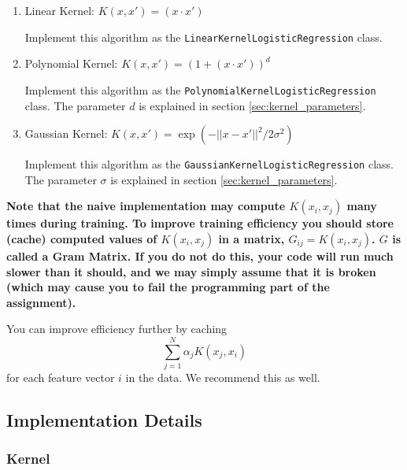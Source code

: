 \documentclass[11pt]{article}
\newcommand{\code}[1]{{\footnotesize \tt #1}}
\begin{document}
\begin{enumerate}
\item Linear Kernel: $K(x, x') = (x \cdot x')$

Implement this algorithm as the \code{LinearKernelLogisticRegression}
class. 

\item Polynomial Kernel: $K(x, x') = (1 + (x \cdot x'))^d$

Implement this algorithm as the
\code{PolynomialKernelLogisticRegression} class. 
The parameter $d$ is explained in section \ref{sec:kernel_parameters}.

\item Gaussian Kernel: $K(x, x') = \exp(-|| x-x'||^2 / 2 \sigma^2)$

Implement this algorithm as the
\code{GaussianKernelLogisticRegression} class. 
The parameter $\sigma$ is explained in section \ref{sec:kernel_parameters}.

\end{enumerate}

{\bf Note that the naive implementation may compute $K(x_i,x_j)$ many
  times during training. To improve training efficiency you should
  store (cache) computed values of $K(x_i,x_j)$ in a matrix,
  $G_{ij}=K(x_i, x_j)$. $G$ is called a Gram Matrix. If you do not do
  this, your code will run much slower than it should, and we may
  simply assume that it is broken (which may cause you to fail the
  programming part of the assignment).}

You can improve efficiency further by caching 
\[
\sum_{j=1}^{N} \alpha_j K(x_j, x_i)
\] 
for each feature vector $i$ in the data.
We recommend this as well.


\subsection{Implementation Details}

\subsubsection{Kernel}
\label{sec:kernel}
\end{document}
